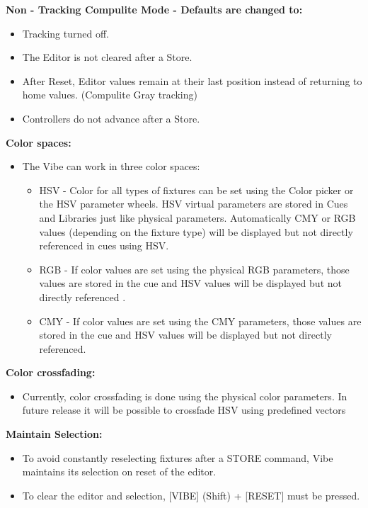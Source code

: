 \documentclass[
]{article}
\providecommand{\tightlist}{%
  \setlength{\itemsep}{0pt}\setlength{\parskip}{0pt}}
\begin{document}
\textbf{Non - Tracking Compulite Mode - Defaults are changed to:}

\begin{itemize}
\item
  Tracking turned off.
\item
  The Editor is not cleared after a Store.
\item
  After Reset, Editor values remain at their last position instead of returning to home values. (Compulite Gray tracking)
\item
  Controllers do not advance after a Store.
\end{itemize}

\textbf{Color spaces:}

\begin{itemize}
\item
  The Vibe can work in three color spaces:

  \begin{itemize}
  \item
    HSV - Color for all types of fixtures can be set using the Color picker or the HSV parameter wheels. HSV virtual parameters are stored in Cues and Libraries just like physical parameters. Automatically CMY or RGB values (depending on the fixture type) will be displayed but not directly referenced in cues using HSV.
  \item
    RGB - If color values are set using the physical RGB parameters, those values are stored in the cue and HSV values will be displayed but not directly referenced .
  \item
    CMY - If color values are set using the CMY parameters, those values are stored in the cue and HSV values will be displayed but not directly referenced.
  \end{itemize}
\end{itemize}

\textbf{Color crossfading:}

\begin{itemize}
\tightlist
\item
  Currently, color crossfading is done using the physical color parameters. In future release it will be possible to crossfade HSV using predefined vectors
\end{itemize}

\textbf{Maintain Selection:}

\begin{itemize}
\item
  To avoid constantly reselecting fixtures after a STORE command, Vibe maintains its selection on reset of the editor.
\item
  To clear the editor and selection, {[}VIBE{]} (Shift) + {[}RESET{]} must be pressed.
\end{itemize}
\end{document}
